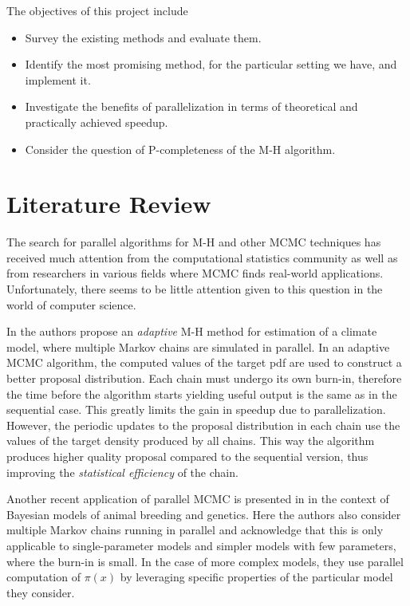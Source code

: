 \documentclass[11pt,letterpaper]{article}       %
\begin{document}
The objectives of this project include
\begin{itemize}
\item Survey the existing methods and evaluate them.
\item Identify the most promising method, for the particular setting we have, and implement it.
\item Investigate the benefits of parallelization in terms of theoretical and
     practically achieved speedup.
\item Consider the question of P-completeness of the M-H algorithm.
\end{itemize}



\section{Literature Review} \label{litrev}

The search for parallel algorithms for M-H and other MCMC techniques has received
much attention from the computational statistics community as well as from 
researchers in various fields where MCMC finds real-world applications.  
Unfortunately, there seems to be little attention given to this question 
in the world of computer science.

In \cite{solonen2012efficient} the authors propose an \emph{adaptive} M-H
method for estimation of a climate model, where multiple Markov chains are
simulated in parallel.  In an adaptive MCMC algorithm, the computed values of
the target pdf are used to construct a better proposal distribution.  Each
chain must undergo its own burn-in, therefore the time before the algorithm
starts yielding useful output is the same as in the sequential case.  This
greatly limits the gain in speedup due to parallelization.  However, the
periodic updates to the proposal distribution in each chain use the values of
the target density produced by all chains.  This way the algorithm produces
higher quality proposal compared to the sequential version, thus improving the
\emph{statistical efficiency} of the chain.

Another recent application of parallel MCMC is presented in
\cite{wu2012parallel} in the context of Bayesian models of animal breeding and
genetics.  Here the authors also consider multiple Markov chains running in
parallel and acknowledge that this is only applicable to single-parameter
models and simpler models with few parameters, where the burn-in is small.  In
the case of more complex models, they use parallel computation of $\pi(x)$ by
leveraging specific properties of the particular model they consider.
\end{document}
